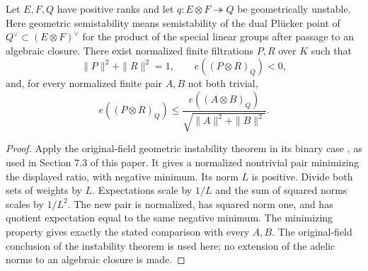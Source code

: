 \begin{lemma}
\label{lem:induction-geometric-optimizer}
\leanok
Let $E,F,Q$ have positive ranks and let
$q:E\otimes F\twoheadrightarrow Q$ be geometrically unstable. Here
geometric semistability means semistability of the dual Pl\"ucker point
of $Q^\vee\subset(E\otimes F)^\vee$ for the product of the special
linear groups after passage to an algebraic closure. There exist
normalized finite filtrations $P,R$ over $K$ such that
\[
 \|P\|^2+\|R\|^2=1,\qquad e((P\otimes R)_Q)<0,
\]
and, for every normalized finite pair $A,B$ not both trivial,
\[
 e((P\otimes R)_Q)\le
 \frac{e((A\otimes B)_Q)}{\sqrt{\|A\|^2+\|B\|^2}}.
\]
\end{lemma}
\begin{proof}
Apply the original-field geometric instability theorem in its binary
case \cite[Theorem 5.4.3]{chenmoriwaki2020}, as used in Section 7.3 of
this paper. It gives a normalized nontrivial pair minimizing the
displayed ratio, with negative minimum. Its norm $L$ is positive.
Divide both sets of weights by $L$. Expectations scale by $1/L$ and
the sum of squared norms scales by $1/L^2$. The new pair is normalized,
has squared norm one, and has quotient expectation equal to the same
negative minimum. The minimizing property gives exactly the stated
comparison with every $A,B$. The original-field conclusion of the
instability theorem is used here; no extension of the adelic norms to
an algebraic closure is made.
\end{proof}

